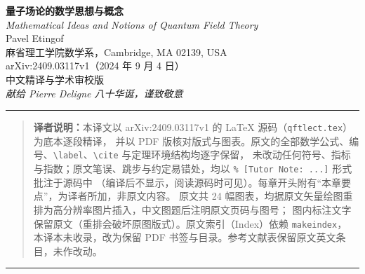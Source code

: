 \documentclass[12pt]{article}
\begin{document}
\begin{center}
  {\LARGE\bfseries 量子场论的数学思想与概念}\\[12pt]
  {\large\itshape Mathematical Ideas and Notions of Quantum Field Theory}\\[20pt]
  {\large Pavel Etingof}\\[6pt]
  {\small 麻省理工学院数学系，Cambridge, MA 02139, USA}\\[16pt]
  {\small arXiv:2409.03117v1\quad（2024 年 9 月 4 日）}\\[6pt]
  {\small 中文精译与学术审校版}\\[16pt]
  {\itshape 献给 Pierre Deligne 八十华诞，谨致敬意}
\end{center}

\vspace{1.5em}

\noindent\rule{\textwidth}{0.6pt}

\begin{quote}
\small
\textbf{译者说明：}本译文以 arXiv:2409.03117v1 的 \LaTeX{} 源码（\texttt{qftlect.tex}）为底本逐段精译，
并以 PDF 版核对版式与图表。原文的全部数学公式、编号、\verb|\label|、\verb|\cite| 与定理环境结构均逐字保留，
未改动任何符号、指标与指数；原文笔误、跳步与约定易错处，均以 \verb|% [Tutor Note: ...]| 形式批注于源码中
（编译后不显示，阅读源码时可见）。每章开头附有“本章要点”，为译者所加，非原文内容。
原文共 24 幅图表，均据原文矢量绘图重排为高分辨率图片插入，中文图题后注明原文页码与图号；
图内标注文字保留原文（重排会破坏原图版式）。原文索引（Index）依赖 \texttt{makeindex}，
本译本未收录，改为保留 PDF 书签与目录。参考文献表保留原文英文条目，未作改动。
\end{quote}

\noindent\rule{\textwidth}{0.6pt}

\vspace{1em}

\tableofcontents

\newpage




\end{document}

